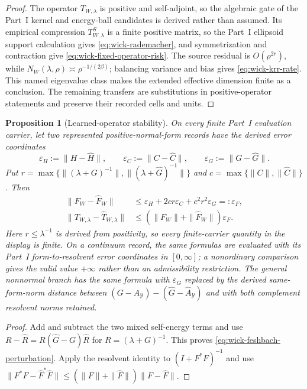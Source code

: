 \documentclass[11pt]{article}
\numberwithin{section}{part}
\theoremstyle{plain}
\newtheorem{proposition}[proposition]{Proposition}
\theoremstyle{definition}
\theoremstyle{remark}
\begin{document}
\begin{proof}
The operator \(T_{W,\lambda}\) is positive and self-adjoint, so the algebraic
gate of the Part~I kernel and energy-ball candidates is derived rather than
assumed.
Its empirical compression \(T_{W,\lambda}^S\) is a finite positive matrix,
so the Part~I ellipsoid support calculation gives
\eqref{eq:wick-rademacher}, and
symmetrization and contraction give
\eqref{eq:wick-fixed-operator-risk}.  The source residual is
\(O(\rho^{2r})\), while
\(N_W(\lambda,\rho)\asymp\rho^{-1/(2\beta)}\); balancing variance and bias
gives \eqref{eq:wick-krr-rate}.  This named eigenvalue class makes the
extended effective dimension finite as a conclusion.  The remaining
transfers are substitutions in positive-operator statements and preserve
their recorded cells and units.
\end{proof}

\begin{proposition}[Learned-operator stability]
\label{prop:wick-learned-operator-stability}
On every finite Part~I evaluation carrier, let two represented
positive-normal-form records have the derived error coordinates
\[
 \varepsilon_H:=\|H-\widehat H\|,
 \qquad
 \varepsilon_C:=\|C-\widehat C\|,
 \qquad
 \varepsilon_G:=\|G-\widehat G\|.
\]
Put
\(r=\max\{\|(\lambda+G)^{-1}\|,
\|(\lambda+\widehat G)^{-1}\|\}\) and
\(c=\max\{\|C\|,\|\widehat C\|\}\).  Then
\begin{align}
 \|F_W-\widehat F_W\|
 &\le\varepsilon_H+2cr\varepsilon_C+c^2r^2\varepsilon_G
 =:\varepsilon_F,
 \label{eq:wick-feshbach-perturbation}\\
 \|T_{W,\lambda}-\widehat T_{W,\lambda}\|
 &\le(\|F_W\|+\|\widehat F_W\|)\varepsilon_F.
 \label{eq:wick-kernel-perturbation}
\end{align}
Here \(r\le\lambda^{-1}\) is derived from positivity, so every finite-carrier
quantity in the display is finite.  On a continuum record, the same formulas
are evaluated with its Part~I form-to-resolvent error coordinates in
\([0,\infty]\); a nonordinary comparison gives the valid value \(+\infty\)
rather than an admissibility restriction.
The general nonnormal branch has the same formula with
\(\varepsilon_G\) replaced by the derived same-form-norm distance between
\((G-A_{\mathcal Y})-(\widehat G-\widehat A_{\mathcal Y})\) and with both
complement resolvent norms retained.
\end{proposition}

\begin{proof}
Add and subtract the two mixed self-energy terms and use
\(R-\widehat R=R(\widehat G-G)\widehat R\) for
\(R=(\lambda+G)^{-1}\).  This proves
\eqref{eq:wick-feshbach-perturbation}.  Apply the resolvent identity to
\((I+F^*F)^{-1}\) and use
\(\|F^*F-\widehat F^*\widehat F\|
\le(\|F\|+\|\widehat F\|)\|F-\widehat F\|\).
\end{proof}
\end{document}
